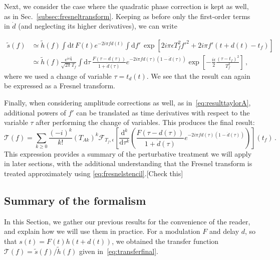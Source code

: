 \documentclass[aps,showpacs,twocolumn,
prd,superscriptaddress,nofootinbib]{revtex4-1}
\newcommand{\be}{\begin{equation}}
\newcommand{\ee}{\end{equation}}
\newcommand\ud{{\mathrm{d}}}
\newcommand\calF{{\mathcal{F}}}
\newcommand\calT{{\mathcal{T}}}
\newcommand{\nn}{\nonumber}
\newcommand{\tf}{t_{f}}
\newcommand{\Tf}{T_{f}}
\newcommand{\jgb}[1]{{\color{DarkGreen} #1}}
\begin{document}
Next, we consider the case where the quadratic phase correction is kept as well, as in Sec.~\ref{subsec:fresneltransform}. Keeping as before only the first-order terms in $\dot{d}$ (and neglecting its higher derivatives), we can write
\begin{widetext}
\begin{align}
	\tilde{s}(f) &\simeq \tilde{h}(f) \int \ud t \, F(t) e^{-2i\pi f d(t)} \int \ud f' \, \exp\left[ 2i\pi \epsilon \Tf^{2} f'^{2} + 2i\pi f' (t+d(t) - \tf) \right] \nn\\
	&\simeq \tilde{h}(f) \frac{e^{i\epsilon\frac{\pi}{4}}}{\sqrt{2\pi}\Tf} \int \ud \tau \, \frac{F(\tau - d(\tau))}{1+\dot{d}(\tau)} e^{-2i\pi f d(\tau)(1-\dot{d}(\tau))}\exp\left[ -\frac{i\epsilon}{2} \frac{(\tau - \tf)^{2}}{\Tf^{2}} \right] \,,
\end{align}
where we used a change of variable $\tau = t_{d}(t)$. We see that the result can again be expressed as a Fresnel transform.

Finally, when considering amplitude corrections as well, as in~\eqref{eq:resulttaylorA}, additional powers of $f'$ can be translated as time derivatives with respect to the variable $\tau$ after performing the change of variables. This produces the final result:
\be\label{eq:transferfinal}
	\calT(f) = \sum\limits_{k \geq 0} \frac{(-i)^{k}}{k!} (T_{Ak})^{k} \calF_{\Tf, \epsilon} \left[ \frac{\ud^{k}}{\ud \tau^{k}} \left( \frac{F(\tau - d(\tau))}{1+\dot{d}(\tau)} e^{-2i\pi f d(\tau)(1-\dot{d}(\tau))} \right) \right] (\tf) \,.
\ee
\jgb{This expression provides a summary of the perturbative treatment we will apply in later sections, with the additional understanding that the Fresnel transform is treated approximately using \eqref{eq:fresnelstencil}.[Check this]}
\end{widetext}

\subsection{Summary of the formalism}\label{subsec:executivesummary}

In this Section, we gather our previous results for the convenience of the reader, and explain how we will use them in practice. For a modulation $F$ and delay $d$, so that $s(t) = F(t) h(t+d(t))$, we obtained the transfer function $\calT (f) = \tilde{s}(f)/\tilde{h}(f)$ given in~\eqref{eq:transferfinal}.
\end{document}
